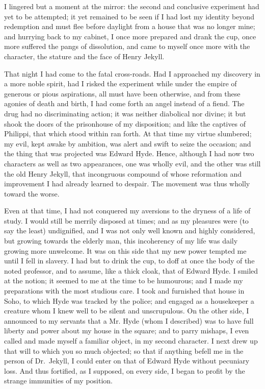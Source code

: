 \documentclass[12pt,openright]{book}
\begin{document}
I lingered but a moment at the mirror: the second and conclusive experiment had yet to be attempted; it yet remained to be seen if I had lost my identity beyond redemption and must flee before daylight from a house that was no longer mine; and hurrying back to my cabinet, I once more prepared and drank the cup, once more suffered the pangs of dissolution, and came to myself once more with the character, the stature and the face of Henry Jekyll.

That night I had come to the fatal cross-roads. Had I approached my discovery in a more noble spirit, had I risked the experiment while under the empire of generous or pious aspirations, all must have been otherwise, and from these agonies of death and birth, I had come forth an angel instead of a fiend. The drug had no discriminating action; it was neither diabolical nor divine; it but shook the doors of the prisonhouse of my disposition; and like the captives of Philippi, that which stood within ran forth. At that time my virtue slumbered; my evil, kept awake by ambition, was alert and swift to seize the occasion; and the thing that was projected was Edward Hyde. Hence, although I had now two characters as well as two appearances, one was wholly evil, and the other was still the old Henry Jekyll, that incongruous compound of whose reformation and improvement I had already learned to despair. The movement was thus wholly toward the worse.

Even at that time, I had not conquered my aversions to the dryness of a life of study. I would still be merrily disposed at times; and as my pleasures were (to say the least) undignified, and I was not only well known and highly considered, but growing towards the elderly man, this incoherency of my life was daily growing more unwelcome. It was on this side that my new power tempted me until I fell in slavery. I had but to drink the cup, to doff at once the body of the noted professor, and to assume, like a thick cloak, that of Edward Hyde. I smiled at the notion; it seemed to me at the time to be humourous; and I made my preparations with the most studious care. I took and furnished that house in Soho, to which Hyde was tracked by the police; and engaged as a housekeeper a creature whom I knew well to be silent and unscrupulous. On the other side, I announced to my servants that a Mr. Hyde (whom I described) was to have full liberty and power about my house in the square; and to parry mishaps, I even called and made myself a familiar object, in my second character. I next drew up that will to which you so much objected; so that if anything befell me in the person of Dr. Jekyll, I could enter on that of Edward Hyde without pecuniary loss. And thus fortified, as I supposed, on every side, I began to profit by the strange immunities of my position.
\end{document}
